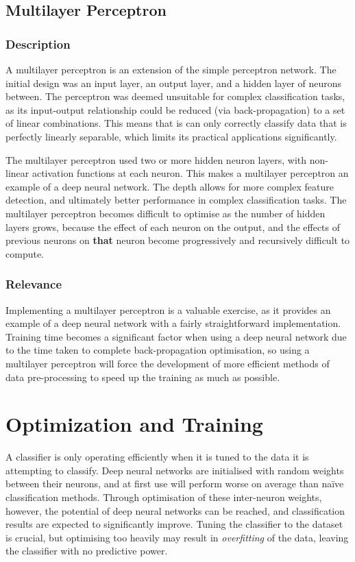 \subsection{Multilayer Perceptron}
\subsubsection{Description}
A multilayer perceptron is an extension of the simple perceptron network. The initial design was an input layer, an output layer, and a hidden layer of neurons between. The perceptron was deemed unsuitable for complex classification tasks, as its input-output relationship could be reduced (via back-propagation) to a set of linear combinations. This means that is can only correctly classify data that is perfectly linearly separable, which limits its practical applications significantly.

The multilayer perceptron used two or more hidden neuron layers, with non-linear activation functions at each neuron. This makes a multilayer perceptron an example of a deep neural network. The depth allows for more complex feature detection, and ultimately better performance in complex classification tasks. The multilayer perceptron becomes difficult to optimise as the number of hidden layers grows, because the effect of each neuron on the output, and the effects of previous neurons on \textbf{that} neuron become progressively and recursively difficult to compute.
\subsubsection{Relevance}
Implementing a multilayer perceptron is a valuable exercise, as it provides an example of a deep neural network with a fairly straightforward implementation. Training time becomes a significant factor when using a deep neural network due to the time taken to complete back-propagation optimisation, so using a multilayer perceptron will force the development of more efficient methods of data pre-processing to speed up the training as much as possible.

\section{Optimization and Training}
A classifier is only operating efficiently when it is tuned to the data it is attempting to classify. Deep neural networks are initialised with random weights between their neurons, and at first use will perform worse on average than na{\"ive} classification methods. Through optimisation of these inter-neuron weights, however, the potential of deep neural networks can be reached, and classification results are expected to significantly improve. Tuning the classifier to the dataset is crucial, but optimising too heavily may result in \textit{overfitting} of the data, leaving the classifier with no predictive power.


